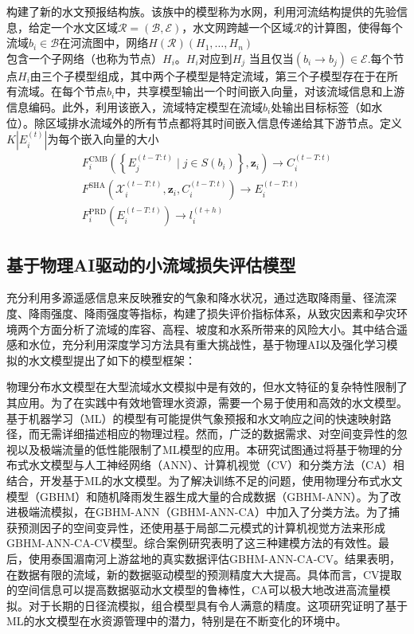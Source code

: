 \documentclass{ctexart}
\begin{document}
构建了新的水文预报结构族。该族中的模型称为水网，利用河流结构提供的先验信息，给定一个水文区域$\mathcal{R}=(\mathcal{B}, \mathcal{E})$，水文网跨越一个区域$\mathcal{R}$的计算图，使得每个流域$b_{i} \in \mathcal{B}$在河流图中，网络$H(\mathcal{R})\left(H_{1}, \ldots, H_{n}\right)$包含一个子网络（也称为节点）$H_{i}$。$H_{i}$对应到$H_{j}$ 当且仅当$\left(b_{i} \rightarrow b_{j}\right) \in \mathcal{E}$.每个节点$H_{i}$由三个子模型组成，其中两个子模型是特定流域，第三个子模型存在于在所有流域。在每个节点$b_{i}$中，共享模型输出一个时间嵌入向量，对该流域信息和上游信息编码。此外，利用该嵌入，流域特定模型在流域$b_{i}$处输出目标标签（如水位）。除区域排水流域外的所有节点都将其时间嵌入信息传递给其下游节点。定义$K\left|E_{i}^{(t)}\right|$为每个嵌入向量的大小
$$
    \begin{array}{l}
        F_{i}^{\mathrm{CMB}}\left(\left\{E_{j}^{(t-T: t)} \mid j \in S\left(b_{i}\right)\right\}, \mathbf{z}_{i}\right) \rightarrow C_{i}^{(t-T: t)} \\
        F^{\mathrm{SHA}}\left(\mathcal{X}_{i}^{(t-T: t)}, \mathbf{z}_{i}, C_{i}^{(t-T: t)}\right) \rightarrow E_{i}^{(t-T: t)}                       \\
        F_{i}^{\mathrm{PRD}}\left(E_{i}^{(t-T: t)}\right) \rightarrow l_{i}^{(t+h)}
    \end{array}
$$

\subsection{基于物理AI驱动的小流域损失评估模型}
充分利用多源遥感信息来反映雅安的气象和降水状况，通过选取降雨量、径流深度、降雨强度、降雨强度等指标，构建了损失评价指标体系，从致灾因素和孕灾环境两个方面分析了流域的库容、高程、坡度和水系所带来的风险大小。其中结合遥感和水位，充分利用深度学习方法具有重大挑战性，基于物理AI以及强化学习模拟的水文模型\cite{yang2020physical}提出了如下的模型框架：

物理分布水文模型在大型流域水文模拟中是有效的，但水文特征的复杂特性限制了其应用。为了在实践中有效地管理水资源，需要一个易于使用和高效的水文模型。基于机器学习（ML）的模型有可能提供气象预报和水文响应之间的快速映射路径，而无需详细描述相应的物理过程。然而，广泛的数据需求、对空间变异性的忽视以及极端流量的低性能限制了ML模型的应用。本研究试图通过将基于物理的分布式水文模型与人工神经网络（ANN）、计算机视觉（CV）和分类方法（CA）相结合，开发基于ML的水文模型。为了解决训练不足的问题，使用物理分布式水文模型（GBHM）和随机降雨发生器生成大量的合成数据（GBHM-ANN）。为了改进极端流模拟，在GBHM-ANN（GBHM-ANN-CA）中加入了分类方法。为了捕获预测因子的空间变异性，还使用基于局部二元模式的计算机视觉方法来形成GBHM-ANN-CA-CV模型。综合案例研究表明了这三种建模方法的有效性。最后，使用泰国湄南河上游盆地的真实数据评估GBHM-ANN-CA-CV。结果表明，在数据有限的流域，新的数据驱动模型的预测精度大大提高。具体而言，CV提取的空间信息可以提高数据驱动水文模型的鲁棒性，CA可以极大地改进高流量模拟。对于长期的日径流模拟，组合模型具有令人满意的精度。这项研究证明了基于ML的水文模型在水资源管理中的潜力，特别是在不断变化的环境中。
\end{document}
